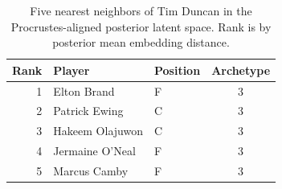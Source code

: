 \begin{table}[htbp]
  \centering\small
  \begin{tabular}{rllc}
    \toprule
    Rank & Player & Position & Archetype \\
    \midrule
    1 & Elton Brand & F & 3 \\
    2 & Patrick Ewing & C & 3 \\
    3 & Hakeem Olajuwon & C & 3 \\
    4 & Jermaine O'Neal & F & 3 \\
    5 & Marcus Camby & F & 3 \\
    \bottomrule
  \end{tabular}
  \caption{Five nearest neighbors of Tim Duncan in the Procrustes-aligned posterior latent space. Rank is by posterior mean embedding distance.}
  \label{tab:Tim_Duncan_neighbors}
\end{table}

